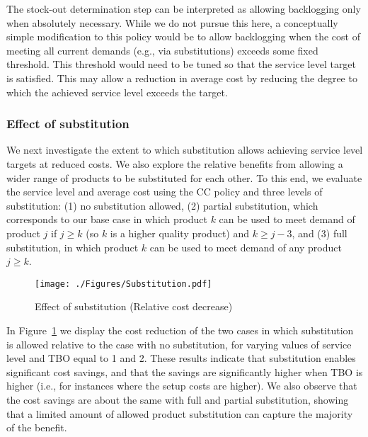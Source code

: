 \documentclass[msom]{oo}
\begin{document}
The stock-out determination step can be interpreted as allowing backlogging only when absolutely necessary. While we do not pursue this here, a conceptually simple modification to this policy would be to allow backlogging when the cost of meeting all current demands (e.g., via substitutions) exceeds some fixed threshold. This threshold would need to be tuned so that the service level target is satisfied. This may allow a reduction in average cost by reducing the degree to which the achieved service level exceeds the target.



\subsubsection{Effect of substitution}

We next investigate the extent to which substitution allows achieving service level targets at reduced costs. We also explore the relative benefits from allowing a wider range of products to be substituted for each other.  To this end, we evaluate the service level and average cost using the CC policy and three levels of substitution: (1) no substitution allowed, (2) partial substitution, which corresponds to our base case in which product
$k$ can be used to meet demand of product $j$ if $j \geq k$ (so $k$ is a higher quality product) and $k \geq j-3$, and (3) full substitution, in which product $k$ can be used to meet demand of any product $j \geq k$.

\begin{figure}[ht]
\begin{center}
\texttt{[image: ./Figures/Substitution.pdf]}
\caption{Effect of substitution (Relative cost decrease)} 
\label{fig:sustitution}
\end{center}
\end{figure}

In Figure~\ref{fig:sustitution} we display the cost reduction of the two cases in which substitution is allowed relative to the case with no substitution, for varying values of service level and TBO equal to 1 and 2. These results indicate that substitution enables significant cost savings, and that the savings are significantly higher when TBO is higher (i.e., for instances where the setup costs are higher).  We also observe that the cost savings are about the same with full and partial substitution, showing that a limited amount of allowed product substitution can capture the majority of the benefit. 
\end{document}
